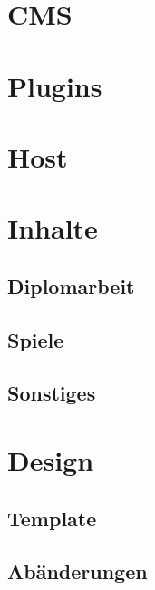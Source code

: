 
\section{CMS}
\section{Plugins}
\section{Host}
\section{Inhalte}
    \subsection{Diplomarbeit}
    \subsection{Spiele}
    \subsection{Sonstiges}
\section{Design}
    \subsection{Template}
    \subsection{Abänderungen}